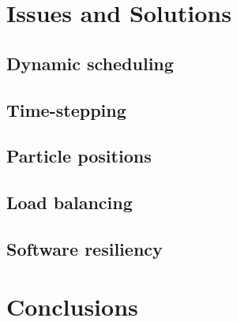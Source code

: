 \documentclass{beamer}
\begin{document}
\section{Issues and Solutions}
%
\subsection{Dynamic scheduling}

\subsection{Time-stepping}

\subsection{Particle positions}

\subsection{Load balancing}

%
%
\subsection{Software resiliency}

%

\section{Conclusions}


\end{document}
